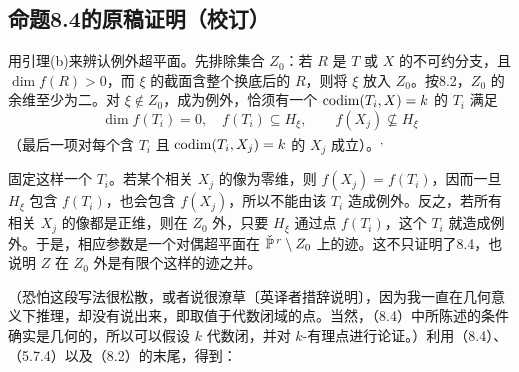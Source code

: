 \subsection*{命题8.4的原稿证明（校订）}
用引理(b)来辨认例外超平面。先排除集合 $Z_0$：若 $R$ 是 $T$ 或 $X$ 的不可约分支，且 $\dim f(R)>0$，而 $\xi$ 的截面含整个换底后的 $R$，则将 $\xi$ 放入 $Z_0$。按8.2，$Z_0$ 的余维至少为二。对 $\xi\notin Z_0$，成为例外，恰须有一个 $\operatorname{codim}(T_i,X)=k$ 的 $T_i$ 满足
\[
 \dim f(T_i)=0,\quad f(T_i)\subseteq H_\xi,\qquad
 f(X_j)\not\subseteq H_\xi
\]
（最后一项对每个含 $T_i$ 且 $\operatorname{codim}(T_i,X_j)=k$ 的 $X_j$ 成立）。\textsuperscript{,}

固定这样一个 $T_i$。若某个相关 $X_j$ 的像为零维，则 $f(X_j)=f(T_i)$，因而一旦 $H_\xi$ 包含 $f(T_i)$，也会包含 $f(X_j)$，所以不能由该 $T_i$ 造成例外。反之，若所有相关 $X_j$ 的像都是正维，则在 $Z_0$ 外，只要 $H_\xi$ 通过点 $f(T_i)$，这个 $T_i$ 就造成例外。于是，相应参数是一个对偶超平面在 $\check{\mathbb P}^{\,r}\setminus Z_0$ 上的迹。这不只证明了8.4，也说明 $Z$ 在 $Z_0$ 外是有限个这样的迹之并。

（恐怕这段写法很松散，或者说很潦草〔英译者措辞说明〕，因为我一直在几何意义下推理，却没有说出来，即取值于代数闭域的点。当然，（8.4）中所陈述的条件确实是几何的，所以可以假设 $k$ 代数闭，并对 $k$-有理点进行论证。）利用（8.4）、（5.7.4）以及（8.2）的末尾，得到：
\endgroup
